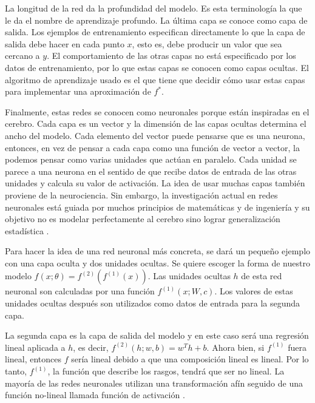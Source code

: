 \vspace{1em}

La longitud de la red da la profundidad del modelo. Es esta terminología la que le da el nombre de aprendizaje profundo. La última capa se conoce como capa de salida. Los ejemplos de entrenamiento especifican directamente lo que la capa de salida debe hacer en cada punto $x$, esto es, debe producir un valor que sea cercano a $y$. El comportamiento de las otras capas no está especificado por los datos de entrenamiento, por lo que estas capas se conocen como capas ocultas. El algoritmo de aprendizaje usado es el que tiene que decidir cómo usar estas capas para implementar una aproximación de $f^*$.

\vspace{1em}

Finalmente, estas redes se conocen como neuronales porque están inspiradas en el cerebro. Cada capa es un vector y la dimensión de las capas ocultas determina el ancho del modelo. Cada elemento del vector puede pensarse que es una neurona, entonces, en vez de pensar a cada capa como una función de vector a vector, la podemos pensar como varias unidades que actúan en paralelo. Cada unidad se parece a una neurona en el sentido de que recibe datos de entrada de las otras unidades y calcula su valor de activación. La idea de usar muchas capas también proviene de la neurociencia. Sin embargo, la investigación actual en redes neuronales está guiada por muchos principios de matemáticas y de ingeniería y su objetivo no es modelar perfectamente al cerebro sino lograr generalización estadística \cite{goodfellow-et-al-2016}.

\vspace{1em}

Para hacer la idea de una red neuronal más concreta, se dará un pequeño ejemplo con una capa oculta y dos unidades ocultas. Se quiere escoger la forma de nuestro modelo $f(x;\theta) = f^{(2)}(f^{(1)}(x))$. Las unidades ocultas $h$ de esta red neuronal son calculadas por una función $f^{(1)}(x;W,c)$. Los valores de estas unidades ocultas después son utilizados como datos de entrada para la segunda capa. 

\vspace{1em}

La segunda capa es la capa de salida del modelo y en este caso será una regresión lineal aplicada a $h$, es decir, $f^{(2)}(h;w,b) = w^Th + b$. Ahora bien, si $f^{(1)}$ fuera lineal, entonces $f$ sería lineal debido a que una composición lineal es lineal. Por lo tanto, $f^{(1)}$, la función que describe los rasgos, tendrá que ser no lineal. La mayoría de las redes neuronales utilizan una transformación afín seguido de una función no-lineal llamada función de activación \cite{goodfellow-et-al-2016}.

